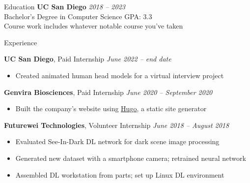 

	\begin{rSection}{Education}
		{\bf UC San Diego} \hfill {\em 2018 -- 2023} 
		\\ Bachelor's Degree in Computer Science\hfill { GPA: 3.3 }
		\\ Course work includes whatever notable course you've taken
		\\

	\end{rSection}
	
	\begin{rSection}{Experience}

		{\bf UC San Diego}{, Paid Internship} \hfill {\em June 2022 -- end date}
		\begin{itemize}
			\item Created animated human head models for a virtual interview project
		\end{itemize}

		{\bf Genvira Biosciences}{, Paid Internship} \hfill {\em June 2020 -- September 2020}
		\begin{itemize}
			\item Built the company's website using \href{https://gohugo.io/}{Hugo}, a static site generator
		\end{itemize}

		{\bf Futurewei Technologies}{, Volunteer Internship} \hfill {\em June 2018 -- August 2018}
		\begin{itemize}
			\item Evaluated See-In-Dark DL network for dark scene image processing
			\item Generated new dataset with a smartphone camera; retrained neural network
			\item Assembled DL workstation from parts; set up Linux DL environment
		\end{itemize}
	\end{rSection}
	
